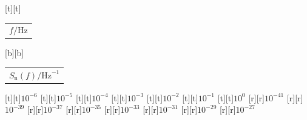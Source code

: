%    
%
%
\begin{psfrags}%
\psfragscanon%
%
[t][t]{\color[rgb]{0,0,0}\setlength{\tabcolsep}{0pt}\begin{tabular}{c}{\Large $f/\mathrm{Hz}$}\end{tabular}}%
[b][b]{\color[rgb]{0,0,0}\setlength{\tabcolsep}{0pt}\begin{tabular}{c}{\Large $S_\mathrm{n}(f)/\mathrm{Hz}^{-1}$\vspace{2.5mm}}\end{tabular}}%
%
[t][t]{$10^{-6}$}%
[t][t]{$10^{-5}$}%
[t][t]{$10^{-4}$}%
[t][t]{$10^{-3}$}%
[t][t]{$10^{-2}$}%
[t][t]{$10^{-1}$}%
[t][t]{$10^{0}$}%
%
[r][r]{$10^{-41}$}%
[r][r]{$10^{-39}$}%
[r][r]{$10^{-37}$}%
[r][r]{$10^{-35}$}%
[r][r]{$10^{-33}$}%
[r][r]{$10^{-31}$}%
[r][r]{$10^{-29}$}%
[r][r]{$10^{-27}$}%
%
%
\end{psfrags}%
%
